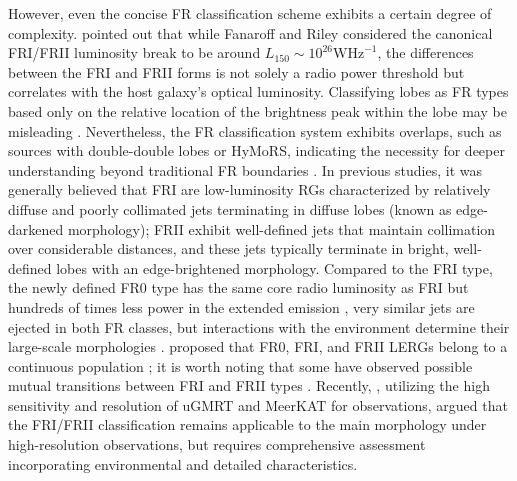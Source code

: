 \documentclass{aa}
\begin{document}
However, even the concise FR classification scheme exhibits a certain degree of complexity. \cite{ledlow_20cm_1996} pointed out that while Fanaroff and Riley considered the canonical FRI/FRII luminosity break to be around $L_{150} \sim 10^{26} \si{\watt}\si{\hertz}^{-1}$, the differences between the FRI and FRII forms is not solely a radio power threshold but correlates with the host galaxy's optical luminosity. Classifying lobes as FR types based only on the relative location of the brightness peak within the lobe may be misleading \citep{gopal-krishna_physically-motivated_2023,gasperin_multifrequency_2017}. Nevertheless, the FR classification system exhibits overlaps, such as sources with double-double lobes or HyMoRS, indicating the necessity for deeper understanding beyond traditional FR boundaries \citep{mingo_revisiting_2019,gopal-krishna_extragalactic_2000}. In previous studies, it was generally believed that FRI are low-luminosity RGs characterized by relatively diffuse and poorly collimated jets terminating in diffuse lobes (known as edge-darkened morphology); FRII exhibit well-defined jets that maintain collimation over considerable distances, and these jets typically terminate in bright, well-defined lobes with an edge-brightened morphology. Compared to the FRI type, the newly defined FR0 type has the same core radio luminosity as FRI but hundreds of times less power in the extended emission \citep{baldi_radio_2009,baldi_pilot_2015,baldi_new_2016,baldi_fr0cat_2018}, very similar jets are ejected in both FR classes, but interactions with the environment determine their large-scale morphologies \citep{gopal-krishna_extragalactic_2000}. proposed that FR0, FRI, and FRII LERGs belong to a continuous population \citep{baldi_fr0cat_2018}; it is worth noting that some have observed possible mutual transitions between FRI and FRII types \citep{foschi_evolution_2025,wang_entrainment-limited_2011}. Recently, \cite{fanaroff_new_2021}, utilizing the high sensitivity and resolution of uGMRT and MeerKAT for observations, argued that the FRI/FRII classification remains applicable to the main morphology under high-resolution observations, but requires comprehensive assessment incorporating environmental and detailed characteristics.
\end{document}
